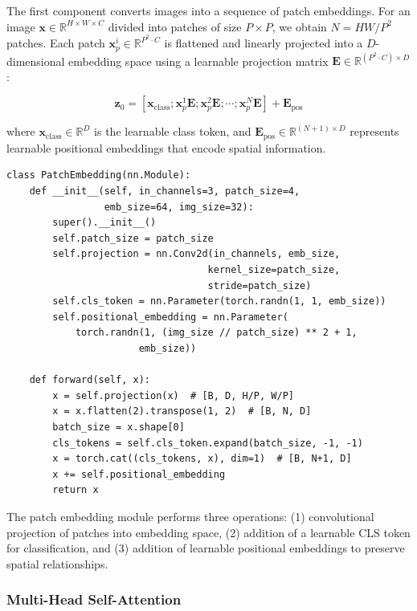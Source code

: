 \documentclass{article}
\begin{document}
The first component converts images into a sequence of patch embeddings. For an image $\mathbf{x} \in \mathbb{R}^{H \times W \times C}$ divided into patches of size $P \times P$, we obtain $N = HW/P^2$ patches. Each patch $\mathbf{x}_p^i \in \mathbb{R}^{P^2 \cdot C}$ is flattened and linearly projected into a $D$-dimensional embedding space using a learnable projection matrix $\mathbf{E} \in \mathbb{R}^{(P^2 \cdot C) \times D}$:

\begin{equation}
\mathbf{z}_0 = [\mathbf{x}_{\text{class}}; \mathbf{x}_p^1\mathbf{E}; \mathbf{x}_p^2\mathbf{E}; \cdots; \mathbf{x}_p^N\mathbf{E}] + \mathbf{E}_{\text{pos}}
\label{eq:patch_embedding}
\end{equation}

where $\mathbf{x}_{\text{class}} \in \mathbb{R}^D$ is the learnable class token, and $\mathbf{E}_{\text{pos}} \in \mathbb{R}^{(N+1) \times D}$ represents learnable positional embeddings that encode spatial information.

\begin{lstlisting}[caption={Patch Embedding Implementation}]
class PatchEmbedding(nn.Module):
    def __init__(self, in_channels=3, patch_size=4, 
                 emb_size=64, img_size=32):
        super().__init__()
        self.patch_size = patch_size
        self.projection = nn.Conv2d(in_channels, emb_size, 
                                   kernel_size=patch_size, 
                                   stride=patch_size)
        self.cls_token = nn.Parameter(torch.randn(1, 1, emb_size))
        self.positional_embedding = nn.Parameter(
            torch.randn(1, (img_size // patch_size) ** 2 + 1, 
                       emb_size))
    
    def forward(self, x):
        x = self.projection(x)  # [B, D, H/P, W/P]
        x = x.flatten(2).transpose(1, 2)  # [B, N, D]
        batch_size = x.shape[0]
        cls_tokens = self.cls_token.expand(batch_size, -1, -1)
        x = torch.cat((cls_tokens, x), dim=1)  # [B, N+1, D]
        x += self.positional_embedding
        return x
\end{lstlisting}

The patch embedding module performs three operations: (1) convolutional projection of patches into embedding space, (2) addition of a learnable CLS token for classification, and (3) addition of learnable positional embeddings to preserve spatial relationships.

\subsubsection{Multi-Head Self-Attention}
\end{document}
